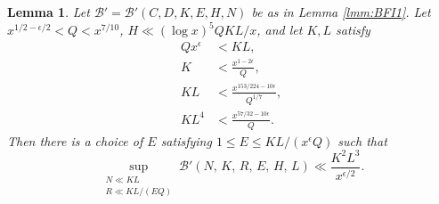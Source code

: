 \documentclass[10pt]{amsart}
\theoremstyle{plain}
\newtheorem{lmm}[thrm]{Lemma}
\numberwithin{equation}{section}
\begin{document}
%
%
%
%
%
%
%
%
\begin{lmm}\label{lmm:NewBFI}
Let $\mathscr{B}'=\mathscr{B}'(C,D,K,E,H,N)$ be as in Lemma \ref{lmm:BFI1}. Let $x^{1/2-\epsilon/2}<Q<x^{7/10}$, $H\ll (\log{x})^5 Q K L/x$, and let $K,L$ satisfy
\begin{align}
Qx^\epsilon &< KL,\\
K&<\frac{x^{1-2\epsilon}}{Q},\\
KL &< \frac{x^{153/224-10\epsilon}}{Q^{1/7}},\\
K L^{4}&<\frac{x^{57/32-10\epsilon}}{Q}.
\end{align}
Then there is a choice of $E$ satisfying $1\le E\le KL/(x^\epsilon Q)$ such that
\[
\sup_{\substack{N\ll KL\\ R\ll KL/(EQ)}}\mathscr{B}'(N,\,K,\, R,\,E,\,H,\,L)\ll \frac{K^2L^3}{x^{\epsilon/2}}.
\]
\end{lmm}
%
%
%
%
\end{document}
